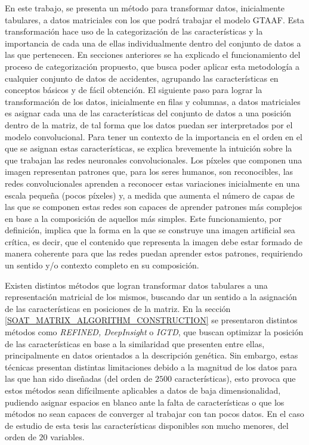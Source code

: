 En este trabajo, se presenta un método para transformar datos, inicialmente tabulares, a datos matriciales con los que podrá trabajar el modelo GTAAF. Esta transformación hace uso de la categorización de las características y la importancia de cada una de ellas individualmente dentro del conjunto de datos a las que pertenecen. En secciones anteriores se ha explicado el funcionamiento del proceso de categorización propuesto, que busca poder aplicar esta metodología a cualquier conjunto de datos de accidentes, agrupando las características en conceptos básicos y de fácil obtención. El siguiente paso para lograr la transformación de los datos, inicialmente en filas y columnas, a datos matriciales es asignar cada una de las características del conjunto de datos a una posición dentro de la matriz, de tal forma que los datos puedan ser interpretados por el modelo convolucional. Para tener un contexto de la importancia en el orden en el que se asignan estas características, se explica brevemente la intuición sobre la que trabajan las redes neuronales convolucionales. Los píxeles que componen una imagen representan patrones que, para los seres humanos, son reconocibles, las redes convolucionales aprenden a reconocer estas variaciones inicialmente en una escala pequeña (pocos píxeles) y, a medida que aumenta el número de capas de las que se componen estas redes son capaces de aprender patrones más complejos en base a la composición de aquellos más simples. Este funcionamiento, por definición, implica que la forma en la que se construye una imagen artificial sea crítica, es decir, que el contenido que representa la imagen debe estar formado de manera coherente para que las redes puedan aprender estos patrones, requiriendo un sentido y/o contexto completo en su composición.

Existen distintos métodos que logran transformar datos tabulares a una representación matricial de los mismos, buscando dar un sentido a la asignación de las características en posiciones de la matriz. En la sección \ref{SOAT_MATRIX_ALGORITHM_CONSTRUCTION} se presentaron distintos métodos como \textit{REFINED, DeepInsight} o \textit{IGTD}, que buscan optimizar la posición de las características en base a la similaridad que presenten entre ellas, principalmente en datos orientados a la descripción genética. Sin embargo, estas técnicas presentan distintas limitaciones debido a la magnitud de los datos para las que han sido diseñadas (del orden de $2500$ características), esto provoca que estos métodos sean difícilmente aplicables a datos de baja dimensionalidad, pudiendo asignar espacios en blanco ante la falta de características o que los métodos no sean capaces de converger al trabajar con tan pocos datos. En el caso de estudio de esta tesis las características disponibles son mucho menores, del orden de $20$ variables.


